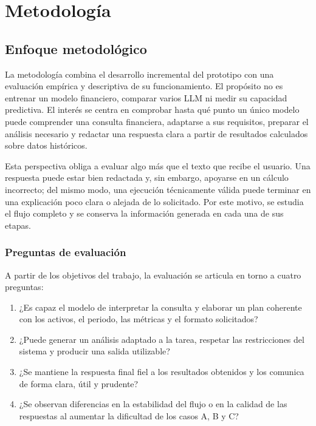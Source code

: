 \chapter{Metodología}

\section{Enfoque metodológico}

La metodología combina el desarrollo incremental del prototipo con una evaluación empírica y descriptiva de su funcionamiento. El propósito no es entrenar un modelo financiero, comparar varios LLM ni medir su capacidad predictiva. El interés se centra en comprobar hasta qué punto un único modelo puede comprender una consulta financiera, adaptarse a sus requisitos, preparar el análisis necesario y redactar una respuesta clara a partir de resultados calculados sobre datos históricos.

Esta perspectiva obliga a evaluar algo más que el texto que recibe el usuario. Una respuesta puede estar bien redactada y, sin embargo, apoyarse en un cálculo incorrecto; del mismo modo, una ejecución técnicamente válida puede terminar en una explicación poco clara o alejada de lo solicitado. Por este motivo, se estudia el flujo completo y se conserva la información generada en cada una de sus etapas.

\subsection{Preguntas de evaluación}

A partir de los objetivos del trabajo, la evaluación se articula en torno a cuatro preguntas:

\begin{enumerate}
    \item ¿Es capaz el modelo de interpretar la consulta y elaborar un plan coherente con los activos, el periodo, las métricas y el formato solicitados?
    \item ¿Puede generar un análisis adaptado a la tarea, respetar las restricciones del sistema y producir una salida utilizable?
    \item ¿Se mantiene la respuesta final fiel a los resultados obtenidos y los comunica de forma clara, útil y prudente?
    \item ¿Se observan diferencias en la estabilidad del flujo o en la calidad de las respuestas al aumentar la dificultad de los casos A, B y C?
\end{enumerate}

